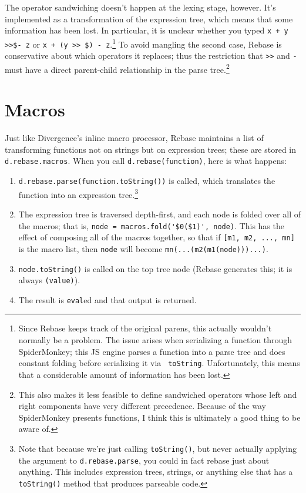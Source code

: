\documentclass{report}
\begin{document}
      The operator sandwiching doesn't happen at the lexing stage, however. It's implemented as a transformation of the expression tree, which means that some information has been lost. In
      particular, it is unclear whether you typed \verb|x + y >>$- z| or \verb|x + (y >> $) - z|.\footnote{Since Rebase keeps track of the original parens, this actually wouldn't normally be a
      problem. The issue arises when serializing a function through SpiderMonkey; this JS engine parses a function into a parse tree and does constant folding before serializing it via {\tt
      toString}. Unfortunately, this means that a considerable amount of information has been lost.} To avoid mangling the second case, Rebase is conservative about which operators it
      replaces; thus the restriction that \verb|>>| and \verb|-| must have a direct parent-child relationship in the parse tree.\footnote{This also makes it less feasible to define sandwiched
      operators whose left and right components have very different precedence. Because of the way SpiderMonkey presents functions, I think this is ultimately a good thing to be aware of.}

\chapter {Macros}
    \label{sec:macros}
    Just like Divergence's inline macro processor, Rebase maintains a list of transforming functions not on strings but on expression trees; these are stored in \verb|d.rebase.macros|. When
    you call \verb|d.rebase(function)|, here is what happens:

\begin{enumerate}
\item \verb|d.rebase.parse(function.toString())| is called, which translates the function into an expression tree.\footnote{Note that because we're just calling {\tt toString()}, but never
        actually applying the argument to {\tt d.rebase.parse}, you could in fact rebase just about anything. This includes expression trees, strings, or anything else that has a
        {\tt toString()} method that produces parseable code.}
\item The expression tree is traversed depth-first, and each node is folded over all of the macros; that is, \verb|node = macros.fold('$0($1)', node)|. This has the effect of composing all
        of the macros together, so that if \verb|[m1, m2, ..., mn]| is the macro list, then \verb|node| will become \verb|mn(...(m2(m1(node)))...)|.
\item \verb|node.toString()| is called on the top tree node (Rebase generates this; it is always \verb|(value)|).
\item The result is \verb|eval|ed and that output is returned.
\end{enumerate}
\end{document}
